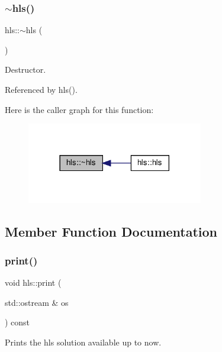 \subsubsection{\texorpdfstring{$\sim$hls()}{~hls()}}
{\footnotesize\ttfamily hls\+::$\sim$hls (\begin{DoxyParamCaption}{ }\end{DoxyParamCaption})\hspace{0.3cm}{\ttfamily [default]}}



Destructor. 



Referenced by hls().

Here is the caller graph for this function\+:
\nopagebreak
\begin{figure}[H]
\begin{center}
\leavevmode
\includegraphics[width=218pt]{d5/d18/classhls_ae4186144f6fabfb957fbea22608d86fa_icgraph}
\end{center}
\end{figure}


\subsection{Member Function Documentation}
\mbox{\label{classhls_af4794ad983e93e87c6dca1e01ae61aa8}} 
\subsubsection{\texorpdfstring{print()}{print()}}
{\footnotesize\ttfamily void hls\+::print (\begin{DoxyParamCaption}\item[{std\+::ostream \&}]{os }\end{DoxyParamCaption}) const}



Prints the hls solution available up to now. 

